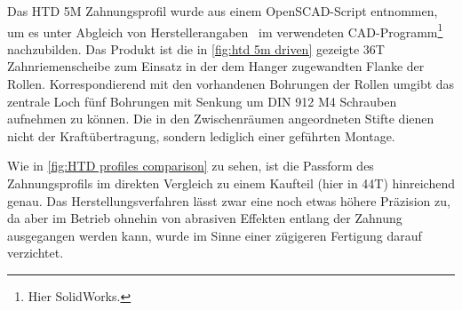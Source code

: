 		Das HTD 5M Zahnungsprofil wurde aus einem OpenSCAD-Script\cite{thingiverse.tooth.profiles.2012} entnommen, um es unter Abgleich von Herstellerangaben~\cite{gates.catalogue.2021,GatesCorporation.drive.design.manual.2014} im verwendeten CAD-Programm\footnote{\hspace{1mm} Hier SolidWorks.} nachzubilden.
		Das Produkt ist die in \cref{fig:htd 5m driven} gezeigte 36T Zahnriemenscheibe zum Einsatz in der dem Hanger zugewandten Flanke der Rollen.
		Korrespondierend mit den vorhandenen Bohrungen der Rollen umgibt das zentrale Loch fünf Bohrungen mit Senkung um DIN 912 M4 Schrauben aufnehmen zu können.
		Die in den Zwischenräumen angeordneten Stifte dienen nicht der Kraftübertragung, sondern lediglich einer geführten Montage.
		
		Wie in \cref{fig:HTD profiles comparison} zu sehen, ist die Passform des Zahnungsprofils im direkten Vergleich zu einem Kaufteil (hier in 44T) hinreichend genau.
		Das Herstellungsverfahren lässt zwar eine noch etwas höhere Präzision zu, da aber im Betrieb ohnehin von abrasiven Effekten entlang der Zahnung ausgegangen werden kann, wurde im Sinne einer zügigeren Fertigung darauf verzichtet.
